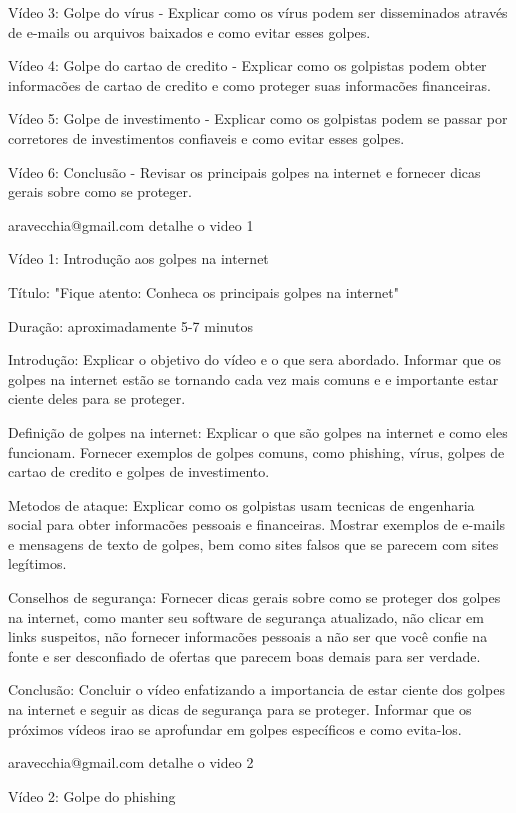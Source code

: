 Vídeo 3: Golpe do vírus - Explicar como os vírus podem ser disseminados através de e-mails ou arquivos baixados e como evitar esses golpes.

Vídeo 4: Golpe do cartao de credito - Explicar como os golpistas podem obter informacões de cartao de credito e como proteger suas informacões financeiras.

Vídeo 5: Golpe de investimento - Explicar como os golpistas podem se passar por corretores de investimentos confiaveis e como evitar esses golpes.

Vídeo 6: Conclusão - Revisar os principais golpes na internet e fornecer dicas gerais sobre como se proteger.

aravecchia@gmail.com
detalhe o video 1

Vídeo 1: Introdução aos golpes na internet

Título: "Fique atento: Conheca os principais golpes na internet"

Duração: aproximadamente 5-7 minutos

Introdução: Explicar o objetivo do vídeo e o que sera abordado. Informar que os golpes na internet estão se tornando cada vez mais comuns e e importante estar ciente deles para se proteger.

Definição de golpes na internet: Explicar o que são golpes na internet e como eles funcionam. Fornecer exemplos de golpes comuns, como phishing, vírus, golpes de cartao de credito e golpes de investimento.

Metodos de ataque: Explicar como os golpistas usam tecnicas de engenharia social para obter informacões pessoais e financeiras. Mostrar exemplos de e-mails e mensagens de texto de golpes, bem como sites falsos que se parecem com sites legítimos.

Conselhos de segurança: Fornecer dicas gerais sobre como se proteger dos golpes na internet, como manter seu software de segurança atualizado, não clicar em links suspeitos, não fornecer informacões pessoais a não ser que você confie na fonte e ser desconfiado de ofertas que parecem boas demais para ser verdade.

Conclusão: Concluir o vídeo enfatizando a importancia de estar ciente dos golpes na internet e seguir as dicas de segurança para se proteger. Informar que os próximos vídeos irao se aprofundar em golpes específicos e como evita-los.

aravecchia@gmail.com
detalhe o video 2

Vídeo 2: Golpe do phishing

